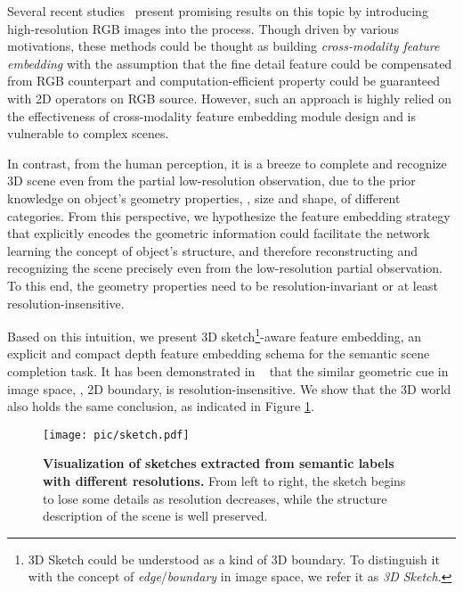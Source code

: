 \documentclass[10pt,twocolumn,letterpaper]{article}
\begin{document}
Several recent studies~\cite{garbade2018two-ts3d,li2019rgbd-ddrnet,liu2018see-satnet} present promising results on this topic by introducing high-resolution RGB images into the process. Though driven by various motivations, these methods could be thought as building \textit{cross-modality feature embedding}  with the assumption that the fine detail feature could be compensated from RGB counterpart and computation-efficient property could be guaranteed with 2D operators on RGB source. However, such an approach is highly relied on the effectiveness of cross-modality feature embedding module design and is vulnerable to complex scenes.

In contrast, from the human perception, it is a breeze to complete and recognize 3D scene even from the partial low-resolution observation, due to the prior knowledge on object's geometry properties, \eg, size and shape, of different categories. From this perspective, we hypothesize the feature embedding strategy that explicitly encodes the geometric information could facilitate the network learning the concept of object's structure, and therefore reconstructing and recognizing the scene precisely even from the low-resolution partial observation. To this end, the geometry properties need to be resolution-invariant or at least resolution-insensitive.

Based on this intuition, we present 3D sketch\footnote{3D Sketch could be understood as a kind of 3D boundary. To distinguish it with the concept of \textit{edge}/\textit{boundary} in image space, we refer it as \textit{3D Sketch}. }-aware feature embedding, an explicit and compact depth feature embedding schema for the semantic scene completion task. It has been demonstrated in ~\cite{shi2017structure} that the similar geometric cue in image space, \ie, 2D boundary, is resolution-insensitive. We show that the 3D world also holds the same conclusion, as indicated in Figure \ref{fig:sketch}.

\begin{figure}[ht]
\centering
\texttt{[image: pic/sketch.pdf]}
\caption{\textbf{Visualization of sketches extracted from semantic labels with different resolutions.} From left to right, the sketch begins to lose some details as resolution decreases, while the structure description of the scene is well preserved.}
\label{fig:sketch}
\end{figure}
\end{document}
